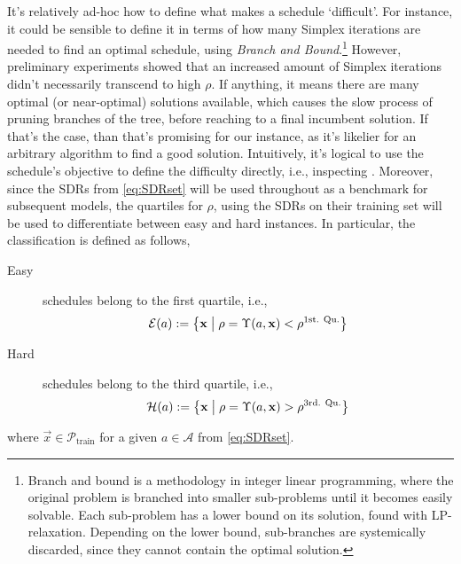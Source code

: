 It's relatively ad-hoc how to define what makes a schedule `difficult'. 
For instance, it could be sensible to define it in terms of how many Simplex 
iterations are needed to find an optimal schedule, using \emph{Branch and 
Bound}.\footnote{Branch and bound \citep{bnb} is a methodology in integer
    linear programming, where the original problem is branched into smaller 
    sub-problems until it becomes easily solvable. Each sub-problem has a lower 
    bound on its solution, found with LP-relaxation. Depending on the lower 
    bound, sub-branches are systemically discarded, since they cannot contain 
    the optimal solution.} 
However, preliminary experiments showed that an increased amount of Simplex 
iterations didn't necessarily transcend to high $\rho$. 
If anything, it means there are many optimal (or near-optimal) solutions 
available, which causes the slow process of pruning branches of the tree, 
before reaching to a final incumbent solution. If that's the case, than that's 
promising for our instance, as it's likelier for an arbitrary algorithm to find 
a good solution. 
Intuitively, it's logical to use the schedule's objective to define the 
difficulty directly, i.e., inspecting \namerho. Moreover, since the SDRs from 
\cref{eq:SDRset} will be used throughout as a benchmark for subsequent models, 
the quartiles for $\rho$, using the SDRs on their training set will be used 
to differentiate between easy and hard instances. In particular, the 
classification is defined as follows, 
\begin{description}
  \item[Easy] schedules belong to the first quartile, i.e., \hfill \\
  \begin{equation}\label{eq:easy}
    \mathcal{E}(a):=\condset{\vec{x}}{
      \rho=\Upsilon(a,\vec{x})<\rho^{\text{1st. Qu.}}}
  \end{equation} 
  \item[Hard] schedules belong to the third quartile, i.e., \hfill \\
  \begin{equation}\label{eq:hard}
    \mathcal{H}(a):=\condset{\vec{x}}{
      \rho=\Upsilon(a,\vec{x})>\rho^{\text{3rd. Qu.}}}
  \end{equation} 
\end{description}
where $\vec{x}\in\mathcal{P}_{\text{train}}$ for a given $a\in\mathcal{A}$ from 
\cref{eq:SDRset}.

 

